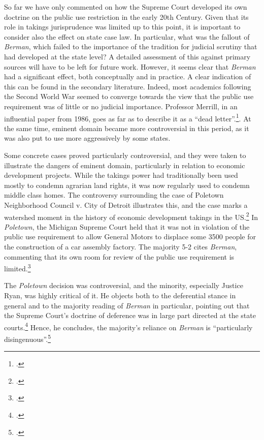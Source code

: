 So far we have only commented on how the Supreme Court developed its own doctrine on the public use restriction in the early 20th Century. Given that its role in takings jurisprudence was limited up to this point, it is important to consider also the effect on state case law. In particular, what was the fallout of {\it Berman}, which failed to  the importance of the tradition for judicial scrutiny that had developed at the state level? A detailed assessment of this against primary sources will have to be left for future work. However, it seems clear that {\it Berman} had a significant effect, both conceptually and in practice. A clear indication of this can be found in the secondary literature. Indeed, most academics following the Second World War seemed to converge towards the view that the public use requirement was of little or no judicial importance. Professor Merrill, in an influential paper from 1986, goes as far as to describe it as a ``dead letter''.\footcite{merrill86}. At the same time, eminent domain became more controversial in this period, as it was also put to use more aggressively by some states.

 Some concrete cases proved particularly controversial, and they were taken to illustrate the dangers of eminent domain, particularly in relation to economic development projects. While the takings power had traditionally been used mostly to condemn agrarian land rights, it was now regularly used to condemn middle class homes. The controversy surrounding the case of Poletown Neighborhood Council v. City of Detroit  illustrates this, and the case marks a watershed moment in the history of  economic development takings in the US.\footcite[See][380-381]{sandefur05} In {\it Poletown}, the Michigan Supreme Court held that it was not in violation of the public use requirement to allow General Motors to displace some 3500 people for the construction of a car assembly factory. The majority 5-2 cites {\it Berman}, commenting that its own room for review of the public use requirement is limited.\footcite[632-633]{poletown81}

The {\it Poletown} decision was controversial, and the minority, especially Justice Ryan, was highly critical of it. He objects both to the deferential stance in general and to the majority reading of {\it Berman} in particular, pointing out that the Supreme Court's doctrine of deference was in large part directed at the state courts.\footcite[668]{poletown81} Hence, he concludes, the majority's reliance on {\it Berman} is ``particularly disingenuous''.\footcite[668]{poletown81} 


